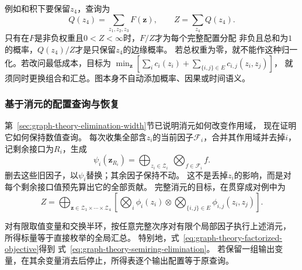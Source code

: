 例如和积下要保留\(z_4\)，查询为
\[
  Q(z_4)=\sum_{z_1,z_2,z_3}F(\bm z),\qquad
  Z=\sum_{z_4}Q(z_4).
\]
只有在\(F\)是非负权重且\(0<Z<\infty\)时，\(F/Z\)才为每个完整配置分配
非负且总和为\(1\)的概率，\(Q(z_4)/Z\)才是只保留\(z_4\)的边缘概率。
若总权重为零，就不能作这种归一化。若改问最低成本，目标为
\(\min_{\bm z}[\sum_i c_i(z_i)+\sum_{\{i,j\}\in E}c_{i,j}(z_i,z_j)]\)，
就须同时更换组合和汇总。图本身不自动添加概率、因果或时间语义。

\subsubsection{基于消元的配置查询与恢复}

第~\ref{sec:graph-theory-elimination-width}节已说明消元如何改变作用域，
现在证明它如何保持数值查询。
每次收集全部含\(z_i\)的当前因子\(\mathcal F_i\)，合并其作用域并去掉\(i\)，
记剩余接口为\(R_i\)，生成
\[
  \psi_i(\bm z_{R_i})
  =\bigoplus_{z_i\in\mathcal Z_i}\ \bigotimes_{f\in\mathcal F_i}f.
\]
删去这些旧因子，以\(\psi_i\)替换；其余因子保持不动。
这不是丢掉\(z_i\)的影响，而是对每个剩余接口值预先算出它的全部贡献。
完整消元的目标，在贯穿成对例中为
\begin{equation}
  Z=\bigoplus_{\bm z\in\mathcal Z_1\times\cdots\times\mathcal Z_4}
  \left[
    \bigotimes_i\phi_i(z_i)
    \otimes\bigotimes_{\{i,j\}\in E}\phi_{i,j}(z_i,z_j)
  \right].
  \label{eq:graph-theory-semiring-elimination}
\end{equation}

\begin{theorem}[半环变量消除的正确性]
  \label{thm:graph-theory-semiring-elimination}
  对有限取值变量和交换半环，按任意完整次序对有限个局部因子执行上述消元，
  所得标量等于直接枚举的全局汇总。
  特别地，式~\eqref{eq:graph-theory-factorized-objective}得到
  式~\eqref{eq:graph-theory-semiring-elimination}。
  若保留一组输出变量，在其余变量消去后停止，所得表逐个输出配置等于原查询。
\end{theorem}

